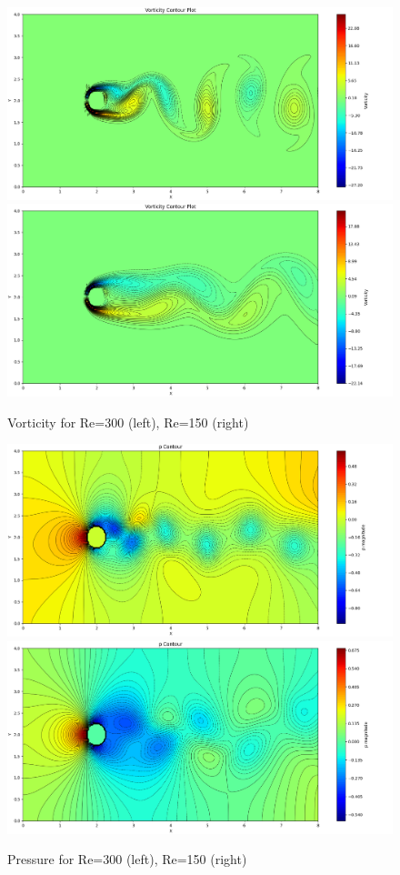 \documentclass[12pt]{article}
\begin{document}
\begin{figure}[H]
    \centering
    \includegraphics[width=0.45\linewidth]{figure/N32_Re300_8x4_t50/vor_N32_Re300_8x4_t50.jpg}
    \includegraphics[width=0.45\linewidth]{figure/N32_Re150_8x4_t50/vor_N32_Re150_8x4_t50.jpg}
    \caption{Vorticity for Re=300 (left), Re=150 (right) }
\end{figure}

\begin{figure}[H]
    \centering
    \includegraphics[width=0.45\linewidth]{figure/N32_Re300_8x4_t50/p_N32_Re300_8x4_t50.jpg}
    \includegraphics[width=0.45\linewidth]{figure/N32_Re150_8x4_t50/p_N32_Re150_8x4_t50.jpg}
    \caption{Pressure for Re=300 (left), Re=150 (right)}
\end{figure}
\end{document}
